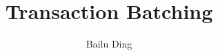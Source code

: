\documentclass[12pt]{article}
\begin{document}
\title{Transaction Batching}
\author{Bailu Ding}

\maketitle









\end{document}
